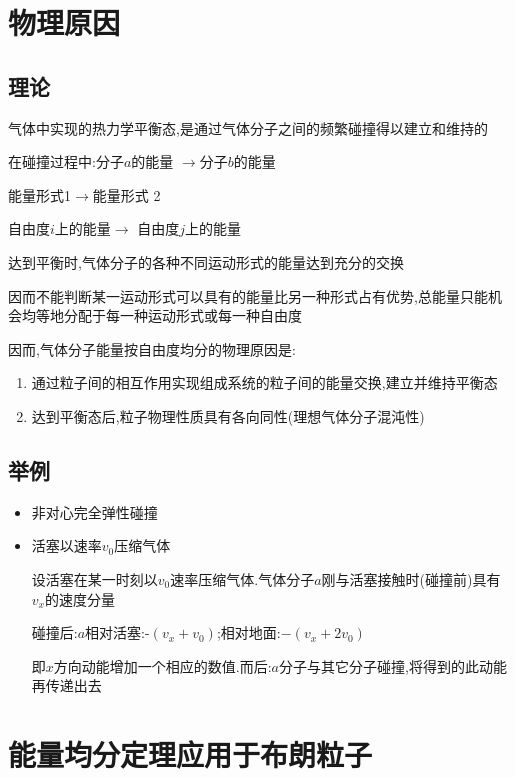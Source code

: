 \documentclass{article}
\begin{document}
\newpage

\section{物理原因}

\subsection{理论}
气体中实现的热力学平衡态,是通过气体分子之间的频繁碰撞得以建立和维持的

在碰撞过程中:分子$a$的能量 $\longrightarrow$分子$b$的能量

能量形式1$\longrightarrow$能量形式 2

自由度$i$上的能量$\longrightarrow$ 自由度$j$上的能量

达到平衡时,气体分子的各种不同运动形式的能量达到充分的交换

因而不能判断某一运动形式可以具有的能量比另一种形式占有优势,总能量只能机会均等地分配于每一种运动形式或每一种自由度

因而,气体分子能量按自由度均分的物理原因是:

\begin{enumerate}
    \item 通过粒子间的相互作用实现组成系统的粒子间的能量交换,建立并维持平衡态
    \item 达到平衡态后,粒子物理性质具有各向同性(理想气体分子混沌性)
\end{enumerate}
 
\subsection{举例}

\begin{itemize}
    \item 非对心完全弹性碰撞
    \item 活塞以速率$v_0$压缩气体
    
    设活塞在某一时刻以$v_0$速率压缩气体.气体分子$a$刚与活塞接触时(碰撞前)具有$v_x$的速度分量

    碰撞后:$a$相对活塞:-$(v_x+v_0)$;相对地面:$-(v_x+2v_0)$

    即$x$方向动能增加一个相应的数值.而后:$a$分子与其它分子碰撞,将得到的此动能再传递出去

\end{itemize}

\newpage

\section{能量均分定理应用于布朗粒子}
\end{document}
